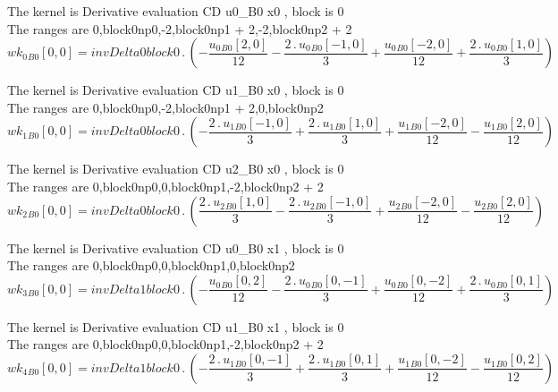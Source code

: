 \documentclass{article}
\begin{document}
\noindent The kernel is Derivative evaluation CD u0_B0 x0 , block is 0\\\noindent The ranges are 0,block0np0,-2,block0np1 + 2,-2,block0np2 + 2\\\begin{dmath}{wk_{0}{_{B0}}}[{0,0}] = invDelta0block0 \,.\, \left(- \frac{{u_{0}{_{B0}}}[{2,0}]}{12} - \frac{2 \,.\, {u_{0}{_{B0}}}[{-1,0}]}{3} + \frac{{u_{0}{_{B0}}}[{-2,0}]}{12} + \frac{2 \,.\, {u_{0}{_{B0}}}[{1,0}]}{3}\right)\end{dmath}

\noindent The kernel is Derivative evaluation CD u1_B0 x0 , block is 0\\\noindent The ranges are 0,block0np0,-2,block0np1 + 2,0,block0np2\\\begin{dmath}{wk_{1}{_{B0}}}[{0,0}] = invDelta0block0 \,.\, \left(- \frac{2 \,.\, {u_{1}{_{B0}}}[{-1,0}]}{3} + \frac{2 \,.\, {u_{1}{_{B0}}}[{1,0}]}{3} + \frac{{u_{1}{_{B0}}}[{-2,0}]}{12} - \frac{{u_{1}{_{B0}}}[{2,0}]}{12}\right)\end{dmath}

\noindent The kernel is Derivative evaluation CD u2_B0 x0 , block is 0\\\noindent The ranges are 0,block0np0,0,block0np1,-2,block0np2 + 2\\\begin{dmath}{wk_{2}{_{B0}}}[{0,0}] = invDelta0block0 \,.\, \left(\frac{2 \,.\, {u_{2}{_{B0}}}[{1,0}]}{3} - \frac{2 \,.\, {u_{2}{_{B0}}}[{-1,0}]}{3} + \frac{{u_{2}{_{B0}}}[{-2,0}]}{12} - \frac{{u_{2}{_{B0}}}[{2,0}]}{12}\right)\end{dmath}

\noindent The kernel is Derivative evaluation CD u0_B0 x1 , block is 0\\\noindent The ranges are 0,block0np0,0,block0np1,0,block0np2\\\begin{dmath}{wk_{3}{_{B0}}}[{0,0}] = invDelta1block0 \,.\, \left(- \frac{{u_{0}{_{B0}}}[{0,2}]}{12} - \frac{2 \,.\, {u_{0}{_{B0}}}[{0,-1}]}{3} + \frac{{u_{0}{_{B0}}}[{0,-2}]}{12} + \frac{2 \,.\, {u_{0}{_{B0}}}[{0,1}]}{3}\right)\end{dmath}

\noindent The kernel is Derivative evaluation CD u1_B0 x1 , block is 0\\\noindent The ranges are 0,block0np0,0,block0np1,-2,block0np2 + 2\\\begin{dmath}{wk_{4}{_{B0}}}[{0,0}] = invDelta1block0 \,.\, \left(- \frac{2 \,.\, {u_{1}{_{B0}}}[{0,-1}]}{3} + \frac{2 \,.\, {u_{1}{_{B0}}}[{0,1}]}{3} + \frac{{u_{1}{_{B0}}}[{0,-2}]}{12} - \frac{{u_{1}{_{B0}}}[{0,2}]}{12}\right)\end{dmath}
\end{document}

